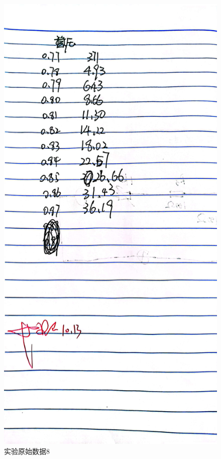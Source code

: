 \documentclass{ctexart}
\begin{document}
\begin{figure}[H]
  \centering
  \includegraphics[width=1\textwidth,height=0.8\textheight]{wenyazhengxiang2.jpg}
  \caption{实验原始数据8}\label{wenyazhengxiang2}
\end{figure}
\newpage
\end{document}

